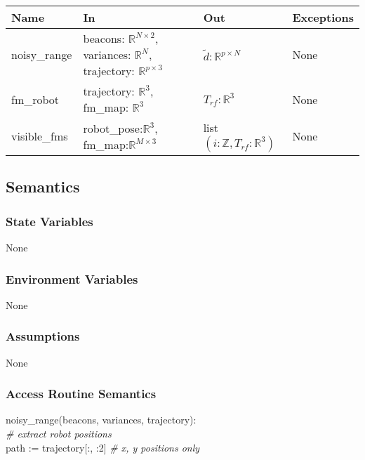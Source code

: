 \documentclass[12pt, titlepage]{article}
\begin{document}
\begin{center}
  \begin{tabular}{p{3cm} p{5.5cm} p{2.5cm} p{3cm}}
  \hline
  \textbf{Name} & \textbf{In} & \textbf{Out} & \textbf{Exceptions} \\
  \hline
  noisy\_range & 
  beacons: $\mathbb{R}^{N \times 2}$, 
  variances: $\mathbb{R}^N$, 
  trajectory: $\mathbb{R}^{p \times 3}$ & 
  $\tilde{d}: \mathbb{R}^{p \times N}$ & 
  None \\
  
  fm\_robot & 
  trajectory: $\mathbb{R}^3$, 
  fm\_map: $\mathbb{R}^3$ & 
  $T_{rf} : \mathbb{R}^3$ & 
  None \\
  
  visible\_fms & 
  robot\_pose:$\mathbb{R}^3$, 
  fm\_map:$\mathbb{R}^{M \times 3}$ & 
  list $(i: \mathbb{Z}, T_{rf}:\mathbb{R}^3)$ & 
  None \\
  \hline
  \end{tabular}
  \end{center}
  

\subsection{Semantics}

\subsubsection{State Variables}
None

\subsubsection{Environment Variables}
None

\subsubsection{Assumptions}
None

\subsubsection{Access Routine Semantics}

\noindent noisy\_range(beacons, variances, trajectory): \\

\noindent \textit{\# extract robot positions} \\
path := trajectory[:, :2] \textit{\# x, y positions only} \\
\end{document}
